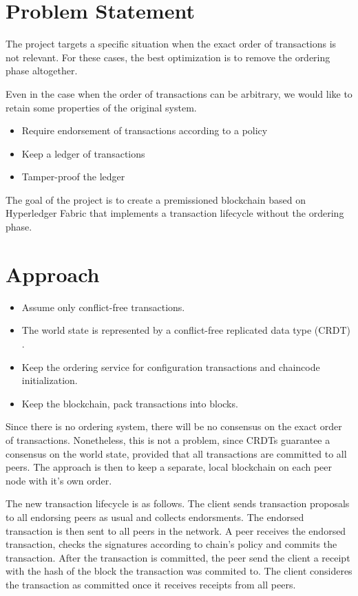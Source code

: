 \section{Problem Statement}
\label{sec:problemStatement}

The project targets a specific situation when the exact order of transactions is not relevant. For these cases, the best optimization is to remove the ordering phase altogether.

Even in the case when the order of transactions can be arbitrary, we would like to retain some properties of the original system.

\begin{itemize}
  \item Require endorsement of transactions according to a policy
  \item Keep a ledger of transactions
  \item Tamper-proof the ledger
\end{itemize}

The goal of the project is to create a premissioned blockchain based on Hyperledger Fabric that implements a transaction lifecycle without the ordering phase.

\section{Approach}
 \label{sec:approach}

\begin{itemize}
  \item Assume only conflict-free transactions.
  \item The world state is represented by a conflict-free replicated data type (CRDT) \cite{lit:merging-crdt}.
  \item Keep the ordering service for configuration transactions and chaincode initialization.
  \item Keep the blockchain, pack transactions into blocks.
\end{itemize}

 Since there is no ordering system, there will be no consensus on the exact order of transactions. Nonetheless, this is not a problem, since CRDTs guarantee a consensus on the world state, provided that all transactions are committed to all peers. The approach is then to keep a separate, local blockchain on each peer node with it's own order.

 The new transaction lifecycle is as follows.
 The client sends transaction proposals to all endorsing peers as usual and collects endorsments. The endorsed transaction is then sent to all peers in the network. A peer receives the endorsed transaction, checks the signatures according to chain's policy and commits the transaction. After the transaction is committed, the peer send the client a receipt with the hash of the block the transaction was commited to. The client consideres the transaction as committed once it receives receipts from all peers.

